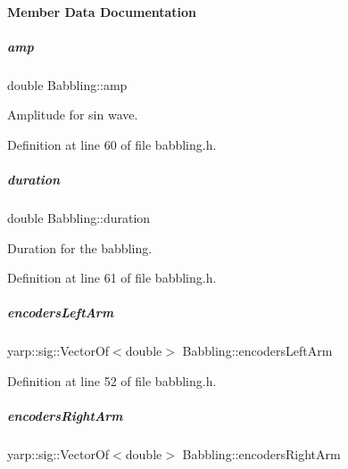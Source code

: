 \paragraph{Member Data Documentation}
\mbox{\label{group__babbling_ab962dd24eb3bd00db6cb7f8a33bb6496}} 
\subparagraph{\texorpdfstring{amp}{amp}}
{\footnotesize\ttfamily double Babbling\+::amp\hspace{0.3cm}{\ttfamily [protected]}}



Amplitude for sin wave. 



Definition at line 60 of file babbling.\+h.

\mbox{\label{group__babbling_a72831e25ddc4b9e79b46dbc25b0923eb}} 
\subparagraph{\texorpdfstring{duration}{duration}}
{\footnotesize\ttfamily double Babbling\+::duration\hspace{0.3cm}{\ttfamily [protected]}}



Duration for the babbling. 



Definition at line 61 of file babbling.\+h.

\mbox{\label{group__babbling_a9ef28388394d078d6578764a6435017c}} 
\subparagraph{\texorpdfstring{encoders\+Left\+Arm}{encodersLeftArm}}
{\footnotesize\ttfamily yarp\+::sig\+::\+Vector\+Of$<$double$>$ Babbling\+::encoders\+Left\+Arm\hspace{0.3cm}{\ttfamily [protected]}}



Definition at line 52 of file babbling.\+h.

\mbox{\label{group__babbling_ab8d18ae468c969406e3689fc08732430}} 
\subparagraph{\texorpdfstring{encoders\+Right\+Arm}{encodersRightArm}}
{\footnotesize\ttfamily yarp\+::sig\+::\+Vector\+Of$<$double$>$ Babbling\+::encoders\+Right\+Arm\hspace{0.3cm}{\ttfamily [protected]}}



